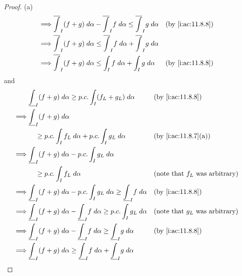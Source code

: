 \begin{proof}{(a)}
\begin{align*}
    \implies & \overline{\int}_I (f + g) \; d \alpha - \overline{\int}_I f \; d \alpha \leq \overline{\int}_I g \; d \alpha &   & \by{i:ac:11.8.8}                         \\
    \implies & \overline{\int}_I (f + g) \; d \alpha \leq \overline{\int}_I f \; d \alpha + \overline{\int}_I g \; d \alpha &                                              \\
    \implies & \overline{\int}_I (f + g) \; d \alpha \leq \int_I f \; d \alpha + \int_I g \; d \alpha                       &   & \by{i:ac:11.8.8}
  \end{align*}
  and
  \begin{align*}
             & \underline{\int}_I (f + g) \; d \alpha \geq p.c. \int_I (f_L + g_L) \; d \alpha                                 &   & \by{i:ac:11.8.8}                         \\
    \implies & \underline{\int}_I (f + g) \; d \alpha                                                                                                                         \\
             & \quad \geq p.c. \int_I f_L \; d \alpha + p.c. \int_I g_L \; d \alpha                                            &   & \by{i:ac:11.8.7}[a]                      \\
    \implies & \underline{\int}_I (f + g) \; d \alpha - p.c. \int_I g_L \; d \alpha                                                                                           \\
             & \quad \geq p.c. \int_I f_L \; d \alpha                                                                          &   & \text{(note that \(f_L\) was arbitrary)} \\
    \implies & \underline{\int}_I (f + g) \; d \alpha - p.c. \int_I g_L \; d \alpha \geq \underline{\int}_I f \; d \alpha      &   & \by{i:ac:11.8.8}                         \\
    \implies & \underline{\int}_I (f + g) \; d \alpha - \underline{\int}_I f \; d \alpha \geq p.c. \int_I g_L \; d \alpha      &   & \text{(note that \(g_L\) was arbitrary)} \\
    \implies & \underline{\int}_I (f + g) \; d \alpha - \underline{\int}_I f \; d \alpha \geq \underline{\int}_I g \; d \alpha &   & \by{i:ac:11.8.8}                         \\
    \implies & \underline{\int}_I (f + g) \; d \alpha \geq \underline{\int}_I f \; d \alpha + \underline{\int}_I g \; d \alpha &                                              \\

\end{align*}
\end{proof}
